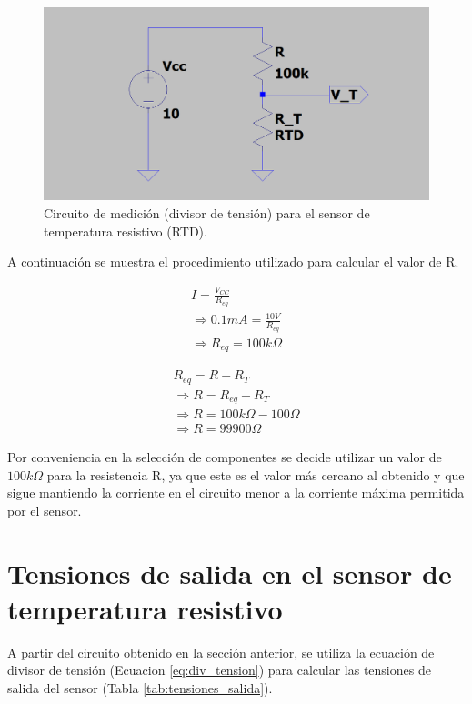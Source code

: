 \documentclass[journal,trans]{IEEEtran}
\begin{document}
\begin{figure}[hbtp]
	\centering
	\includegraphics[width = \columnwidth]{images/circuito_div_tension.png}
	\caption{Circuito de medición (divisor de tensión) para el sensor de temperatura resistivo (RTD).}
    \label{fig:circuito_div_tension}
\end{figure}

A continuación se muestra el procedimiento utilizado para calcular el valor de R.

\begin{gather*}
    I = \frac{V_{CC}}{R_{eq}} \\
    \Longrightarrow 0.1 mA = \frac{10 V}{R_{eq}} \\
    \Longrightarrow R_{eq} = 100 k\Omega
\end{gather*}

\begin{gather*}
    R_{eq} = R + R_{T} \\
    \Longrightarrow R = R_{eq} - R_{T} \\
    \Longrightarrow R = 100 k\Omega - 100 \Omega \\
    \Longrightarrow R = 99 900 \Omega
\end{gather*}

Por conveniencia en la selección de componentes se decide utilizar un valor de $100 k\Omega$ para la resistencia R, ya que este es el valor más cercano al obtenido y que sigue mantiendo la corriente en el circuito menor a la corriente máxima permitida por el sensor.


\section{Tensiones de salida en el sensor de temperatura resistivo} 
A partir del circuito obtenido en la sección anterior, se utiliza la ecuación de divisor de tensión (Ecuacion \ref{eq:div_tension}) para calcular las tensiones de salida del sensor (Tabla \ref{tab:tensiones_salida}).
\end{document}
